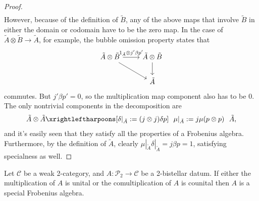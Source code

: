 \documentclass[12pt,a4paper]{article}
\numberwithin{equation}{section}
\begin{document}
\begin{proof}
\begin{align}
    \end{align}
    However, because of the definition of $\tilde{B}$, any of the above maps that involve $\tilde{B}$ in either the domain or codomain have to be the zero map. In the case of $\tilde{A} \otimes \tilde{B} \to \tilde{A}$, for example, the bubble omission property states that
    \begin{equation}
        \begin{tikzcd}
            \tilde{A} \otimes \tilde{B} \arrow[rd] \arrow[r, "1_{\tilde{A}} \otimes j' \beta p'"] & \tilde{A} \otimes \tilde{B} \arrow[d] \\
            & \tilde{A}  
        \end{tikzcd}
    \end{equation}
    commutes. But $j' \beta p' = 0$, so the multiplication map component also has to be 0. The only nontrivial components in the decomposition are
    \begin{equation}
        \tilde{A} \otimes \tilde{A} \xrightleftharpoons[\delta|_{\tilde{A}} :=  (j \otimes j) \delta p]{\ \ \mu|_{\tilde{A}} := j \mu (p \otimes p) \ \ } \tilde{A},
    \end{equation}
    and it's easily seen that they satisfy all the properties of a Frobenius algebra. Furthermore, by the definition of $\tilde{A}$, clearly $\mu|_{\tilde{A}} \delta|_{\tilde{A}} = j \beta p = 1$, satisfying specialness as well.
\end{proof}

\begin{lemma}\label{lem:2_bistellar_with_units}
    Let $\mathscr{C}$ be a weak 2-category, and $A: \mathscr{P}_2 \to \mathscr{C}$ be a 2-bistellar datum. If either the multiplication of $A$ is unital or the comultiplication of $A$ is counital then $A$ is a special Frobenius algebra.
\end{lemma}
\end{document}
